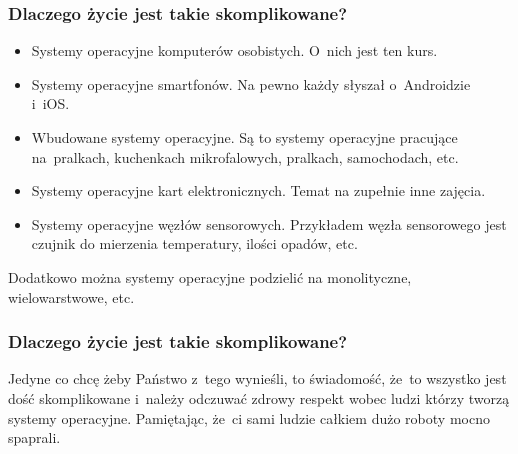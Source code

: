 \documentclass[10pt,t]{beamer}
\begin{document}
\begin{frame}
  \frametitle{Dlaczego życie jest takie skomplikowane?}


  \begin{itemize}

  \item Systemy operacyjne komputerów osobistych. O~nich jest ten kurs.



  \item Systemy operacyjne smartfonów. Na pewno każdy słyszał o~Androidzie
    i~iOS.



  \item Wbudowane systemy operacyjne. Są to systemy operacyjne pracujące
    na~pralkach, kuchenkach mikrofalowych, pralkach, samochodach, etc.



  \item Systemy operacyjne kart elektronicznych. Temat na zupełnie inne
    zajęcia.



  \item Systemy operacyjne węzłów sensorowych. Przykładem węzła sensorowego
    jest czujnik do mierzenia temperatury, ilości opadów, etc.

  \end{itemize}

  Dodatkowo można systemy operacyjne podzielić na monolityczne,
  wielowarstwowe, etc.

\end{frame}





\begin{frame}
  \frametitle{Dlaczego życie jest takie skomplikowane?}


  Jedyne co chcę żeby Państwo z~tego wynieśli, to świadomość, że~to
  wszystko jest dość skomplikowane i~należy odczuwać zdrowy respekt wobec
  ludzi którzy tworzą systemy operacyjne. Pamiętając, że~ci sami ludzie
  całkiem dużo roboty mocno spaprali.

\end{frame}
\end{document}
